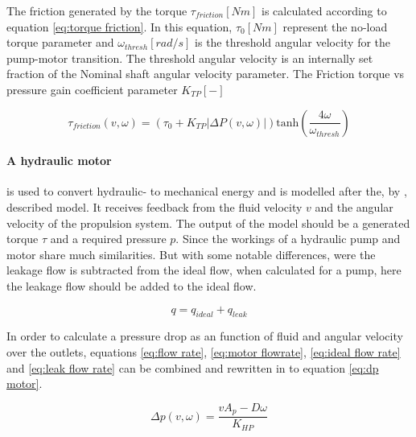 \noindent The friction generated by the torque $ \tau_{friction} [Nm] $ is calculated according to equation \ref{eq:torque friction}. In this equation, $ \tau_0 [Nm] $ represent the no-load torque parameter and $ \omega_{thresh} \left[rad/s\right] $ is the threshold angular velocity for the pump-motor transition. The threshold angular velocity is an internally set fraction of the Nominal shaft angular velocity parameter. The Friction torque vs pressure gain coefficient parameter $ K_{TP} [-] $
\begin{sBox}
	\begin{equation}\label{eq:torque friction}
		\tau_{friction}(v, \omega) = \left(\tau_{0} + K_{TP}|\Delta P(v, \omega)|\right) \text{tanh}\left(\frac{4 \omega}{\omega_{thresh}} \right)
	\end{equation}
\end{sBox}

\paragraph{A hydraulic motor} is used to convert hydraulic- to mechanical energy and is modelled after the, by \citet{mathworks_hydraulic--mechanical_2016}, described model. It receives feedback from the fluid velocity $ v $ and the angular velocity of the propulsion system. The output of the model should be a generated torque $ \tau $ and a required pressure $ p $. Since the workings of a hydraulic pump and motor share much similarities. But with some notable differences, were the leakage flow is subtracted from the ideal flow, when calculated for a pump, here the leakage flow should be added to the ideal flow.

\begin{sBox}
	\begin{equation}\label{eq:motor flowrate}
		q = q_{ideal} + q_{leak}
	\end{equation}
\end{sBox}

\noindent In order to calculate a pressure drop as an function of fluid and angular velocity over the outlets, equations \ref{eq:flow rate}, \ref{eq:motor flowrate}, \ref{eq:ideal flow rate} and \ref{eq:leak flow rate} can be combined and rewritten in to equation \ref{eq:dp motor}.

\begin{sBox}
	\begin{equation}\label{eq:dp motor}
		\Delta p(v, \omega) = \frac{v A_p - D \omega}{K_{HP}}
	\end{equation}
\end{sBox}

